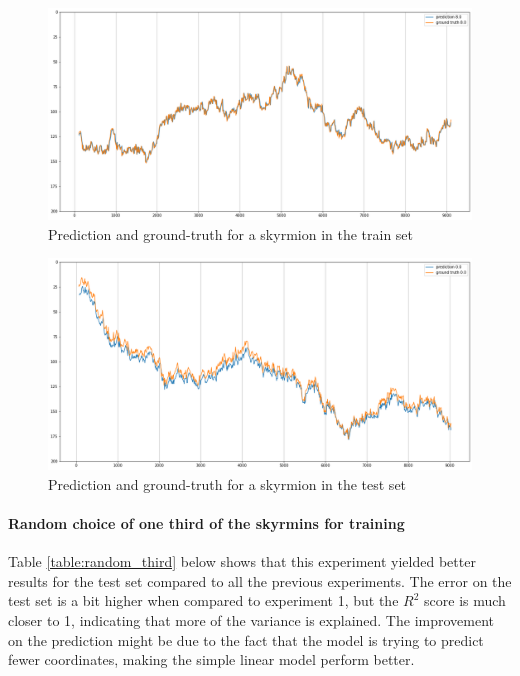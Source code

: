 \documentclass[a4paper]{article}
\begin{document}
  \begin{figure}
    \centering
    \includegraphics[width=\textwidth]{regression4_bottom_half_train_plot.png}
    \caption{Prediction and ground-truth for a skyrmion in the train set}
    \label{fig:regression4_bottom_half_train_plot}
  \end{figure}

  \begin{figure}
    \centering
    \includegraphics[width=\textwidth]{regression4_bottom_half_test_plot.png}
    \caption{Prediction and ground-truth for a skyrmion in the test set}
    \label{fig:regression4_bottom_half_test_plot}
  \end{figure}

  \paragraph{Random choice of one third of the skyrmins for training}

  Table \ref{table:random_third} below shows that this experiment yielded better results for the test set compared to all the previous experiments. The error on the test set is a bit higher when compared to experiment 1, but the $R^2$ score is much closer to 1, indicating that more of the variance is explained. The improvement on the prediction might be due to the fact that the model is trying to predict fewer coordinates, making the simple linear model perform better.
\end{document}
